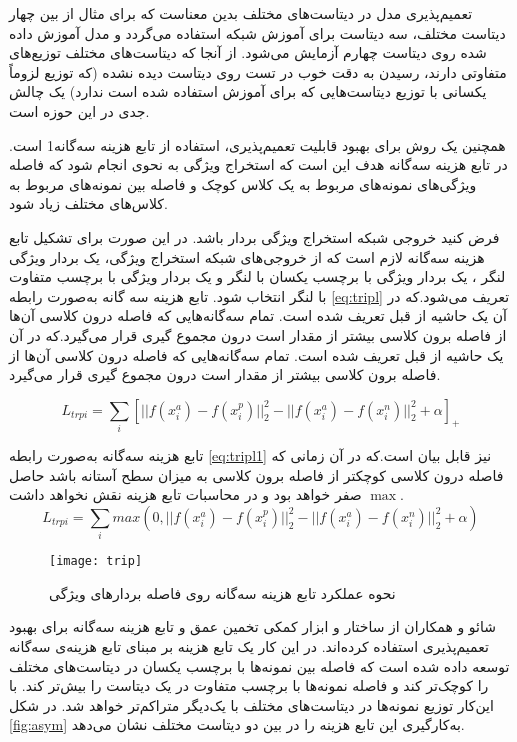 تعمیم‌پذیری مدل در دیتاست‌های مختلف بدین معناست که برای مثال از بین چهار دیتاست مختلف، سه دیتاست برای آموزش شبکه استفاده می‌گردد و مدل آموزش داده شده روی دیتاست چهارم آزمایش می‌شود. از آنجا که دیتاست‌های مختلف توزیع‌های متفاوتی دارند، رسیدن به دقت خوب در تست روی دیتاست دیده نشده (که توزیع لزوماً یکسانی با توزیع دیتاست‌هایی که برای آموزش استفاده شده است ندارد) یک چالش جدی در این حوزه است. 

همچنین یک روش برای بهبود قابلیت تعمیم‌پذیری، استفاده از تابع هزینه سه‌گانه1 
\cite{schroff2015facenet}
است. در تابع هزینه سه‌گانه هدف این است که استخراج ویژگی به نحوی انجام شود که فاصله ویژگی‌های نمونه‌های مربوط به یک کلاس کوچک و فاصله بین نمونه‌های مربوط به کلاس‌های مختلف زیاد شود.

فرض کنید خروجی شبکه استخراج ویژگی بردار  باشد. در این صورت برای تشکیل تابع هزینه سه‌گانه لازم است که از خروجی‌های شبکه استخراج ویژگی، یک بردار ویژگی لنگر ، یک بردار ویژگی با برچسب یکسان با لنگر  و یک بردار ویژگی با برچسب متفاوت با لنگر   انتخاب شود. تابع هزینه سه گانه به‌صورت رابطه
\ref{eq:tripl}
 تعریف می‌شود.که در آن  یک حاشیه از قبل تعریف شده است. تمام سه‌گانه‌هایی که فاصله درون کلاسی آن‌ها از فاصله برون کلاسی بیشتر از مقدار  است درون مجموع گیری قرار می‌گیرد.که در آن  یک حاشیه از قبل تعریف شده است. تمام سه‌گانه‌هایی که فاصله درون کلاسی آن‌ها از فاصله برون کلاسی بیشتر از مقدار  است درون مجموع گیری قرار می‌گیرد.
 
 \begin{equation}\label{eq:tripl}
L_{trpi} = \sum_{i}{[||f(x_i^a)-f(x_i^p)||_2^2-||f(x_i^a)-f(x_i^n)||_2^2+\alpha]_+}
 \end{equation}

تابع هزینه سه‌گانه به‌صورت رابطه
\ref{eq:tripl1}
نیز قابل بیان است.که در آن زمانی که فاصله درون کلاسی کوچکتر از فاصله برون کلاسی به میزان سطح آستانه  باشد حاصل $\max$ صفر خواهد بود و در محاسبات تابع هزینه نقش نخواهد داشت.
 \begin{equation}\label{eq:tripl1}
	L_{trpi} = \sum_{i}{max(0,||f(x_i^a)-f(x_i^p)||_2^2-||f(x_i^a)-f(x_i^n)||_2^2+\alpha)}
\end{equation}

\begin{figure}[t]
	\centerline{\texttt{[image: trip]}}
	\caption{نحوه عملکرد تابع هزینه سه‌گانه روی فاصله بردارهای ویژگی \cite{schroff2015facenet} }
	\label{fig:trip}
\end{figure}
شائو و همکاران
\cite{shao2019multi}
از ساختار  و ابزار کمکی تخمین عمق و تابع هزینه سه‌گانه برای بهبود تعمیم‌پذیری استفاده کرده‌اند. در این کار یک تابع هزینه بر مبنای تابع هزینه‌ی سه‌گانه توسعه داده شده است که فاصله بین نمونه‌ها با برچسب یکسان در دیتاست‌های مختلف را کوچک‌تر کند و فاصله نمونه‌ها با برچسب متفاوت در یک دیتاست را بیش‌تر کند. با این‌کار توزیع نمونه‌ها در دیتاست‌های مختلف با یک‌دیگر متراکم‌تر خواهد شد. در شکل
\ref{fig:asym} 
به‌کارگیری این تابع هزینه را در بین دو دیتاست مختلف نشان می‌دهد.

